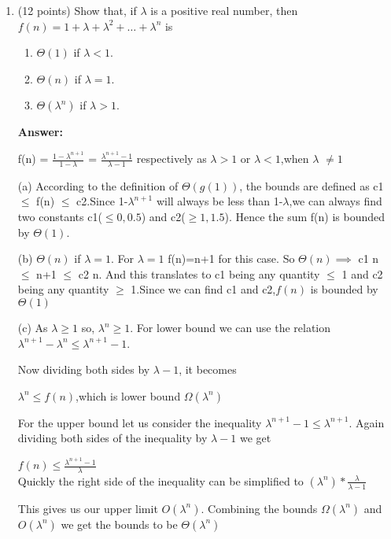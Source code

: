 \documentclass[11pt]{article}
\newcommand{\ans}{\textbf{Answer: }}
\begin{document}
\begin{enumerate}
\newpage


\item (12 points)
Show that, if $\lambda$ is a positive real number, then $f(n)= 1+ \lambda + \lambda^2 + \ldots + \lambda^n$ is
\begin{enumerate}  
\item $\Theta(1)$ if $\lambda<1$. 
\item $\Theta(n)$ if $\lambda=1$.
\item $\Theta(\lambda^n)$ if $\lambda>1$.
\end{enumerate}
\ans
\begin{center}
f(n) = $\frac{1 - \lambda^{n+1}}{1-\lambda }$ = $\frac{ \lambda^{n+1}-1 }{\lambda -1 }$ respectively as $\lambda >1$ or $\lambda <1$,when $\lambda$ $\neq 1$ 
\end{center}
(a) According to the definition of $\Theta{(g(1))} $, the bounds are defined as c1 $\leq$ f(n) $\leq$ c2.Since 1-$\lambda^{n+1}$ will always be less than 1-$\lambda$,we can always find two constants c1($\leq 0,0.5$) and c2($\geq1,1.5$). Hence the sum f(n) is bounded by $\Theta(1).$

(b) $\Theta(n)$ if $\lambda=1$. For $\lambda=1$ 
f(n)=n+1 for this case. So $\Theta{(n)} \implies$
c1 n $\leq$ n+1 $\leq$ c2 n.
And this translates to c1 being any quantity $\leq$ 1 and c2 being any quantity $\geq$ 1.Since we can find c1 and c2,$f(n)$ is bounded by $\Theta(1)$

(c) As $\lambda \geq1 $ so, $\lambda^n \geq 1$. For lower bound we can use the relation $\lambda^{n+1}-\lambda^{n}\leq \lambda^{n+1}-1$.

Now dividing both sides by $\lambda -1 $, it becomes 
\begin{center}
$\lambda^n\leq f(n)$,which is lower bound $\Omega(\lambda^n)$
\end{center}
For the upper bound let us consider the inequality $\lambda^{n+1}-1 \leq \lambda^{n+1}$. Again dividing both sides of the inequality by $\lambda -1$ we get 
\begin{center}
$f(n) \leq \frac{\lambda^{n+1}-1}{\lambda}$\\
Quickly the right side of the inequality can be simplified to $(\lambda^n)* \frac{\lambda}{\lambda -1 } $
\end{center}
This gives us our upper limit $O(\lambda ^n)$. Combining the bounds $\Omega(\lambda^n)$ and $O(\lambda^n)$ we get the bounds to be $\Theta{(\lambda^n)}$


\end{enumerate}
\end{document}
